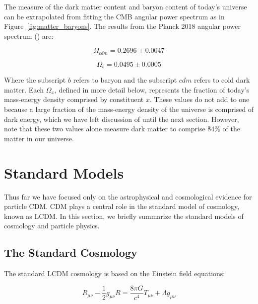 The measure of the dark matter content and baryon content of today's universe can be extrapolated from fitting the \ac{CMB} angular power spectrum as in Figure~\ref{fig:matter_baryons}. The results from the Planck 2018 angular power spectrum (\cite{Planck2018}) are: 

\begin{equation}
\Omega_{cdm} = 0.2696 \pm 0.0047
\end{equation}

\begin{equation}
\Omega_{b}  = 0.0495 \pm 0.0005 
\end{equation}

Where the subscript $b$ refers to baryon and the subscript $cdm$ refers to cold dark matter. Each $\Omega_{x}$, defined in more detail below, represents the fraction of today's mass-energy density comprised by constituent $x$. These values do not add to one because a large fraction of the mass-energy density of the universe is comprised of dark energy, which we have left discussion of until the next section. However, note that these two values alone measure dark matter to comprise \~84\% of the matter in our universe. 



\section{Standard Models}
Thus far we have focused only on the astrophysical and cosmological evidence for particle \ac{CDM}. \ac{CDM} plays a central role in the standard model of cosmology, known as \ac{LCDM}. In this section, we briefly summarize the standard models of cosmology and particle physics. 


\subsection{The Standard Cosmology}
The standard \ac{LCDM} cosmology is based on the Einstein field equations:

\begin{equation}
R_{\mu \nu} - \frac{1}{2} g_{\mu \nu} R = \frac{8 \pi G}{c^{4}} T_{\mu \nu} + \Lambda g_{\mu\nu}
\end{equation}

